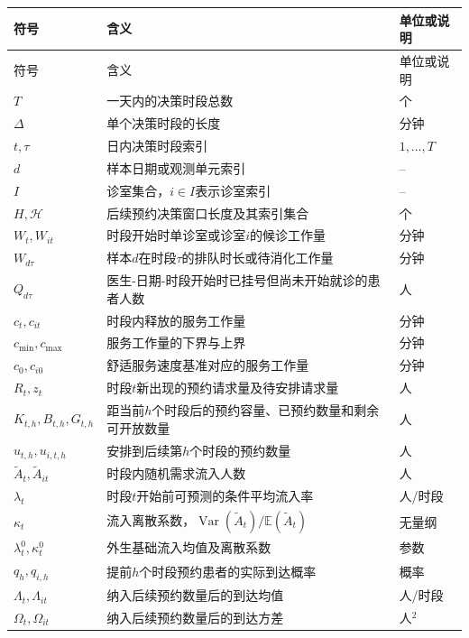 \documentclass[a4paper,zihao=-4]{ctexart}
\newcommand{\E}{\mathbb{E}}
\newcommand{\Var}{\operatorname{Var}}
\numberwithin{figure}{section}
\numberwithin{table}{section}
\begin{document}
\begingroup
\small
{}
\begin{longtable}{>{\centering\arraybackslash}p{}>{\raggedright\arraybackslash}p{}>{\raggedright\arraybackslash}p{}}
  \toprule
  符号 & 含义 & 单位或说明 \\
  \midrule
  \endfirsthead
  \toprule
  符号 & 含义 & 单位或说明 \\
  \midrule
  \endhead
  \bottomrule
  \endfoot
  $T$ & 一天内的决策时段总数 & 个 \\
  $\Delta$ & 单个决策时段的长度 & 分钟 \\
  $t,\tau$ & 日内决策时段索引 & $1,\ldots,T$ \\
  $d$ & 样本日期或观测单元索引 & -- \\
  $I$ & 诊室集合，$i\in I$表示诊室索引 & -- \\
  $H,\mathcal H$ & 后续预约决策窗口长度及其索引集合 & 个 \\
  $W_t,W_{it}$ & 时段开始时单诊室或诊室$i$的候诊工作量 & 分钟 \\
  $W_{d\tau}$ & 样本$d$在时段$\tau$的排队时长或待消化工作量 & 分钟 \\
  $Q_{d\tau}$ & 医生-日期-时段开始时已挂号但尚未开始就诊的患者人数 & 人 \\
  $c_t,c_{it}$ & 时段内释放的服务工作量 & 分钟 \\
  $c_{\min},c_{\max}$ & 服务工作量的下界与上界 & 分钟 \\
  $c_0,c_{i0}$ & 舒适服务速度基准对应的服务工作量 & 分钟 \\
  $R_t,z_t$ & 时段$t$新出现的预约请求量及待安排请求量 & 人 \\
  $K_{t,h},B_{t,h},G_{t,h}$ & 距当前$h$个时段后的预约容量、已预约数量和剩余可开放数量 & 人 \\
  $u_{t,h},u_{i,t,h}$ & 安排到后续第$h$个时段的预约数量 & 人 \\
  $\tilde A_t,\tilde A_{it}$ & 时段内随机需求流入人数 & 人 \\
  $\lambda_t$ & 时段$t$开始前可预测的条件平均流入率 & 人/时段 \\
  $\kappa_t$ & 流入离散系数，$\Var(\tilde A_t)/\E(\tilde A_t)$ & 无量纲 \\
  $\lambda_t^0,\kappa_t^0$ & 外生基础流入均值及离散系数 & 参数 \\
  $q_h,q_{i,h}$ & 提前$h$个时段预约患者的实际到达概率 & 概率 \\
  $\Lambda_t,\Lambda_{it}$ & 纳入后续预约数量后的到达均值 & 人/时段 \\
  $\Omega_t,\Omega_{it}$ & 纳入后续预约数量后的到达方差 & 人$^2$ \\

\end{longtable}
\end{document}
